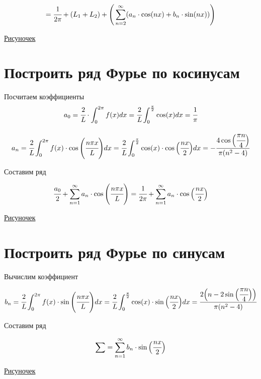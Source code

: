 \documentclass{article}
\begin{document}
$$= \cfrac{1}{2\pi}+(L_1+L_2)+\Bigg(\sum_{n=2}^{\infty}(a_n\cdot\cos(nx)+b_n\cdot\sin(nx))\Bigg)  $$

\href{https://www.desmos.com/calculator/59wiprilp0}{Рисуночек}

\newpage
\section{Построить ряд Фурье по косинусам}

Посчитаем коэффициенты
$$ a_0 = \cfrac{2}{L}\cdot \int_{0}^{2\pi} f(x)dx = \cfrac{2}{L} \int_{0}^{\frac{\pi}{2}} \cos(x)dx=\cfrac{1}{\pi}$$

$$ a_n=\cfrac{2}{L}\int_0^{2\pi} f(x)\cdot\cos\Bigg(\cfrac{n\pi x}{L}\Bigg)dx= \cfrac{2}{L}\int_0^{\frac{\pi}{2}}\cos(x)\cdot\cos\Big(\cfrac{nx}{2}\Big)dx = -\cfrac{4\cos\Big(\cfrac{\pi n}{4}\Big)}{\pi (n^2-4)}$$

Составим ряд

$$ \cfrac{a_0}{2}+\sum_{n=1}^{\infty} a_n\cdot\cos\Bigg(\cfrac{n\pi x}{L}\Bigg) = \cfrac{1}{2\pi} + \sum_{n=1}^{\infty} a_n\cdot\cos\Big(\cfrac{nx}{2}\Big)$$

\href{https://www.desmos.com/calculator/bh6zh4bwxo}{Рисуночек}

\newpage
\section{Построить ряд Фурье по синусам}
Вычислим коэффициент
$$ b_n=\cfrac{2}{L}\int_0^{2\pi} f(x)\cdot\sin\Bigg(\cfrac{n\pi x}{L}\Bigg)dx= \cfrac{2}{L}\int_0^{\frac{\pi}{2}}\cos(x)\cdot\sin\Big(\cfrac{nx}{2}\Big)dx = \cfrac{2\Big(n-2\sin\Big(\cfrac{\pi n}{4}\Big)\Big)}{\pi(n^2-4)}$$

Составим ряд

$$ \sum=\sum_{n=1}^{\infty} b_n\cdot\sin\Big(\cfrac{nx}{2}\Big)$$

\href{https://www.desmos.com/calculator/anislzxvmj}{Рисуночек}
\end{document}
